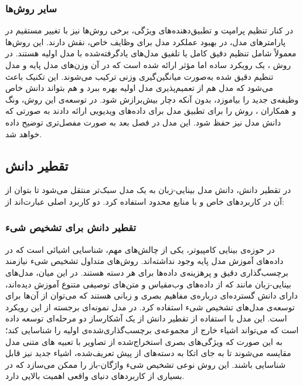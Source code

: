 \subsubsection{سایر روش‌ها}
در کنار تنظیم پرامپت و تطبیق‌دهنده‌های ویژگی، برخی روش‌ها نیز با تغییر مستقیم در پارامتر‌های مدل، در بهبود عملکرد مدل برای وظایف خاص، نقش دارند. این روش‌ها معمولاً شامل تنظیم دقیق کامل یا تلفیق مدل‌های یادگرفته‌شده با مدل اولیه هستند. در روش
\cite{Wise-FT}
، یک رویکرد ساده اما مؤثر ارائه شده است که در آن وزن‌های مدل پایه و مدل تنظیم دقیق شده  به‌صورت میانگین‌گیری وزنی ترکیب می‌شوند. این تکنیک باعث می‌شود که مدل هم از تعمیم‌پذیری مدل اولیه بهره ببرد و هم بتواند دانش خاص وظیفه‌ی جدید را بیاموزد، بدون آنکه دچار بیش‌برازش شود. در توسعه‌ی این روش، ونگ و همکاران
\cite{open-vclip}،
روش 
را برای تطبیق مدل  برای داده‌های ویدیویی ارائه دادند به صورتی که دانش مدل  نیز حفظ شود. این مدل در فصل بعد به صورت مفصل‌تری توضیح داده خواهد شد. 
\subsection{تقطیر دانش}
در تقطیر دانش، دانش مدل بینایی-زبان به یک مدل سبک‌تر منتقل می‌شود تا بتوان از آن در کاربردهای خاص و با منابع محدود استفاده کرد. دو کاربرد اصلی عبارت‌اند از:
\subsubsection{تقطیر دانش برای تشخیص شیء}
در حوزه‌ی بینایی کامپیوتر، یکی از چالش‌های مهم، شناسایی اشیائی است که در داده‌های آموزش مدل پایه وجود نداشته‌اند. روش‌های متداول تشخیص شیء نیازمند برچسب‌گذاری دقیق و پرهزینه‌ی داده‌ها برای هر دسته هستند. در این میان، مدل‌های بینایی-زبان مانند
 که از داده‌های وب‌مقیاس و متن‌های توصیفی متنوع آموزش دیده‌اند، دارای دانش گسترده‌ای درباره‌ی مفاهیم بصری و زبانی هستند که می‌توان از آن‌ها برای توسعه‌ی مدل‌های تشخیص شیء استفاده کرد. در مدل 
 \cite{ViLD}
نمونه‌ای برجسته از این رویکرد است. این مدل با استفاده از تقطیر دانش از 
یک آشکارساز دو مرحله‌ای توسعه داده است که می‌تواند اشیاء خارج از مجموعه‌ی برچسب‌گذاری‌شده‌ی اولیه را شناسایی کند؛ به این صورت که ویژگی‌های بصری استخراج‌شده از تصاویر با تعبیه های متنی مدل
مقایسه می‌شوند تا به جای اتکا به دسته‌های از پیش تعریف‌شده، اشیاء جدید نیز قابل شناسایی باشند. این روش نوعی تشخیص شیء واژگان-باز  را ممکن می‌سازد که در بسیاری از کاربردهای دنیای واقعی اهمیت بالایی دارد.
